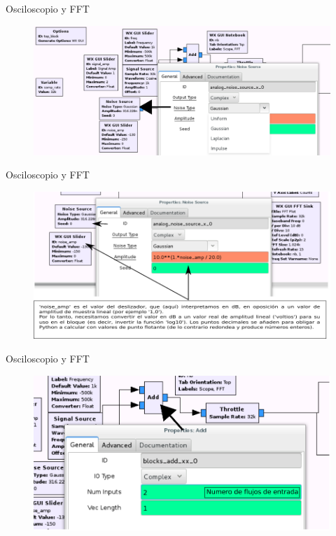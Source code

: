 \begin{frame}{Osciloscopio y FFT}
\begin{figure}[H]
\centering
\includegraphics[width=\textwidth]{lab2/pdf/lab203.pdf}
\end{figure}
\end{frame}

\begin{frame}{Osciloscopio y FFT}
\begin{figure}[H]
\centering
\includegraphics[width=\textwidth]{lab2/pdf/lab204.pdf}
\end{figure}
\end{frame}

\begin{frame}{Osciloscopio y FFT}
\begin{figure}[H]
\centering
\includegraphics[width=\textwidth]{lab2/pdf/lab205.pdf}
\end{figure}
\end{frame}

